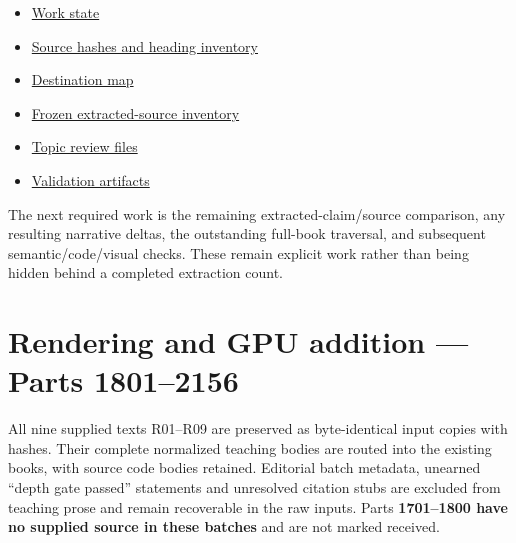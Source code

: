\begin{itemize}
\tightlist
\item
  \href{/Users/swayamsingal/.codex/source-cache/manual-integration-2026-11-10/WORK_STATE.json}{Work state}
\item
  \href{/Users/swayamsingal/.codex/source-cache/manual-integration-2026-11-10/sources.json}{Source hashes and heading inventory}
\item
  \href{/Users/swayamsingal/.codex/source-cache/manual-integration-2026-11-10/route.json}{Destination map}
\item
  \href{/Users/swayamsingal/.codex/source-cache/manual-integration-2026-11-10/extracted-source-manifest.json}{Frozen extracted-source inventory}
\item
  \href{/Users/swayamsingal/.codex/source-cache/manual-integration-2026-11-10/reviews}{Topic review files}
\item
  \href{/Users/swayamsingal/.codex/source-cache/manual-integration-2026-11-10/validation}{Validation artifacts}
\end{itemize}

The next required work is the remaining extracted-claim/source comparison, any resulting narrative deltas, the outstanding full-book traversal, and subsequent semantic/code/visual checks. These remain explicit work rather than being hidden behind a completed extraction count.

\section{Rendering and GPU addition --- Parts 1801--2156}\label{appendix-3b67654799a2-rendering-and-gpu-addition-parts-18012156}

All nine supplied texts R01--R09 are preserved as byte-identical input copies with hashes. Their complete normalized teaching bodies are routed into the existing books, with source code bodies retained. Editorial batch metadata, unearned ``depth gate passed'' statements and unresolved citation stubs are excluded from teaching prose and remain recoverable in the raw inputs. Parts \textbf{1701--1800 have no supplied source in these batches} and are not marked received.

